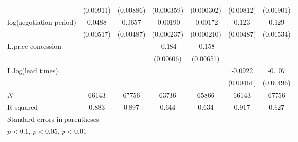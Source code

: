 {\begin{tabular}{l*{6}{c}}
            &   (0.00911)         &   (0.00886)         &  (0.000359)         &  (0.000302)         &   (0.00812)         &   (0.00901)         \\
\addlinespace
log(negotiation period)&      0.0488\sym{***}&      0.0657\sym{***}&    -0.00190\sym{***}&    -0.00172\sym{***}&       0.123\sym{***}&       0.129\sym{***}\\
            &   (0.00517)         &   (0.00487)         &  (0.000237)         &  (0.000210)         &   (0.00487)         &   (0.00534)         \\
\addlinespace
L.price concession&                     &                     &      -0.184\sym{***}&      -0.158\sym{***}&                     &                     \\
            &                     &                     &   (0.00606)         &   (0.00651)         &                     &                     \\
\addlinespace
L.log(lead times)   &                     &                     &                     &                     &     -0.0922\sym{***}&      -0.107\sym{***}\\
            &                     &                     &                     &                     &   (0.00461)         &   (0.00496)         \\
\midrule
\(N\)       &       66143         &       67756         &       63736         &       65866         &       66143         &       67756         \\
R-squared   &       0.883         &       0.897         &       0.644         &       0.634         &       0.917         &       0.927         \\
\bottomrule
\multicolumn{7}{l}{\footnotesize Standard errors in parentheses}\\
\multicolumn{7}{l}{\footnotesize \sym{*} \(p<0.1\), \sym{**} \(p<0.05\), \sym{***} \(p<0.01\)}\\
\end{tabular}
}

